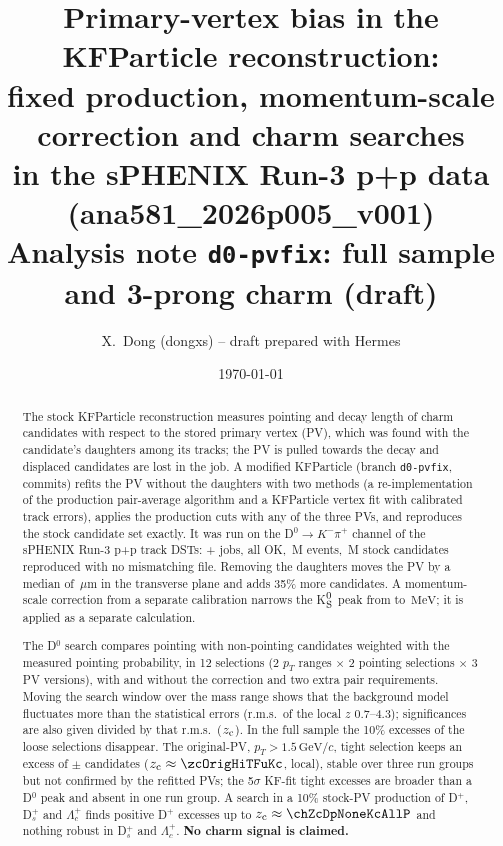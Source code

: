 \documentclass[11pt,a4paper]{article}
\title{Primary-vertex bias in the KFParticle \Dzero{} reconstruction:\\
fixed production, momentum-scale correction and charm searches\\
in the sPHENIX Run-3 p+p data (ana581\_2026p005\_v001)\\[4pt]
\large Analysis note \texttt{d0-pvfix}: full \Dzero{} sample and 3-prong charm (draft)}
\author{X.~Dong (dongxs) \quad -- \quad draft prepared with Hermes}
\date{\today}
\newcommand{\Dzero}{D$^0$}
\newcommand{\pt}{\ensuremath{p_T}}
\newcommand{\um}{\ensuremath{\,\mu\mathrm{m}}}
\newcommand{\gevc}{\ensuremath{\,\mathrm{GeV}/c}}
\newcommand{\mev}{\ensuremath{\,\mathrm{MeV}}}
\newcommand{\Ks}{K$^0_{\rm S}$}
\begin{document}
\maketitle

\begin{abstract}
\noindent
The stock KFParticle reconstruction measures pointing and decay length of charm candidates with respect to the stored
primary vertex (PV), which was found with the candidate's daughters among its tracks; the PV is pulled towards the decay
and displaced candidates are lost in the job. A modified KFParticle (branch \texttt{d0-pvfix}, \nCommits{} commits)
refits the PV without the daughters with two methods (a re-implementation of the production pair-average algorithm and a
KFParticle vertex fit with calibrated track errors), applies the production cuts with any of the three PVs, and
reproduces the stock candidate set exactly. It was run on the \Dzero$\to K^-\pi^+$ channel of the sPHENIX Run-3 p+p
track DSTs: \jobsOkTwo{} + \jobsOkNin{} jobs, all OK, \eventsAll\,M events, \candAllStock\,M stock candidates
reproduced with no mismatching file. Removing the daughters moves the PV by a median of \shPairTwoMed\um{} in the
transverse plane and adds 35\% more candidates. A momentum-scale correction from a separate calibration narrows the
\Ks{} peak from \vKsAllSigRc{} to \vKsAllSigKc\mev; it is applied as a separate calculation.

The \Dzero{} search compares pointing with non-pointing candidates weighted with the measured pointing probability, in
12 selections (2 \pt{} ranges $\times$ 2 pointing selections $\times$ 3 PV versions), with and without the correction and
two extra pair requirements. Moving the search window over the mass range shows that the background model fluctuates
more than the statistical errors (r.m.s.\ of the local $z$ 0.7--4.3); significances are also given divided by that
r.m.s.\ ($z_{\rm c}$). In the full sample the 10\% excesses of the loose selections disappear. The original-PV,
$\pt>1.5\gevc$, tight selection keeps an excess of \exOrigHiTFuKc{} $\pm$ \eexOrigHiTFuKc{} candidates ($z_{\rm c}\approx
\zcOrigHiTFuKc$, local), stable over three run groups but not confirmed by the refitted PVs; the 5$\sigma$ KF-fit tight
excesses are broader than a \Dzero{} peak and absent in one run group. A search in a 10\% stock-PV production of
D$^+$, D$_s^+$ and $\Lambda_c^+$ finds positive D$^+$ excesses up to $z_{\rm c}\approx\chZcDpNoneKcAllP$ and nothing robust
in D$_s^+$ and $\Lambda_c^+$. \textbf{No charm signal is claimed.}


\end{abstract}
\end{document}
